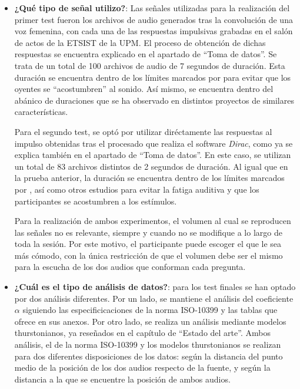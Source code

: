 \documentclass[11pt,a4paper]{book}
\begin{document}
\begin{itemize}
                    
                    \item \textbf{¿Qué tipo de señal utilizo?}: Las señales utilizadas para la realización del primer test fueron los archivos de audio generados tras la convolución de una voz femenina, con cada una de las respuestas impulsivas grabadas en el salón de actos de la ETSIST de la UPM. El proceso de obtención de dichas respuestas se encuentra explicado en el apartado de ``Toma de datos''. Se trata de un total de 100 archivos de audio de 7 segundos de duración. Esta duración se encuentra dentro de los límites marcados por \cite{UIT1116, UIT1534, UIT1284, EBU3286, UIT1285, UIT1286} para evitar que los oyentes se ``acostumbren'' al  sonido. Así mismo, se encuentra dentro del abánico de duraciones que se ha observado en distintos proyectos de similares características. \newline
                
                    Para el segundo test, se optó por utilizar diréctamente las respuestas al impulso obtenidas tras el procesado que realiza el software \textit{Dirac}, como ya se explica también en el apartado de ``Toma de datos''. En este caso, se utilizan un total de 83 archivos distintos de 2 segundos de duración. Al igual que en la prueba anterior, la duración se encuentra dentro de los límites marcados por \cite{UIT1116, UIT1534, UIT1284, EBU3286, UIT1285, UIT1286}, así como otros estudios para evitar la fatiga auditiva y que los participantes se acostumbren a los estímulos.
                
                    Para la realización de ambos experimentos, el volumen al cual se reproducen las señales no es relevante, siempre y cuando no se modifique a lo largo de toda la sesión. Por este motivo, el participante puede escoger el que le sea más cómodo, con la única restricción de que el volumen debe ser el mismo para la escucha de los dos audios que conforman cada pregunta.
                    \item \textbf{¿Cuál es el tipo de análisis de datos?}: para los test finales se han optado por dos análisis diferentes. Por un lado, se mantiene el análisis del coeficiente $\alpha$ siguiendo las especificicaciones de la norma ISO-10399\cite{ISO10399} y las tablas que ofrece en sus anexos. Por otro lado, se realiza un análisis mediante modelos thurstonianos, ya reseñados en el capítulo de ``Estado del arte''. Ambos análisis, el de la norma ISO-10399 y los modelos thurstonianos se realizan para dos diferentes disposiciones de los datos: según la distancia del punto medio de la posición de los dos audios respecto de la fuente, y según la distancia a la que se encuentre la posición de ambos audios.
                     
                \end{itemize}
                
\end{document}
